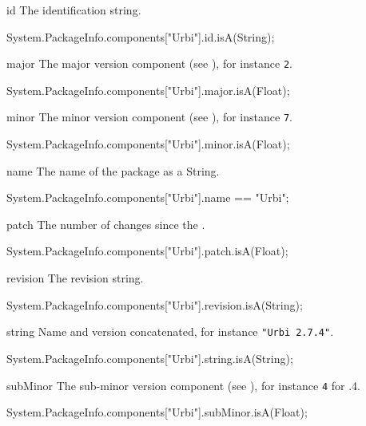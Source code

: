 \begin{urbiscriptapi}
\item[id] The identification string.
\begin{urbiassert}
System.PackageInfo.components["Urbi"].id.isA(String);
\end{urbiassert}


\item[major] The major version component (see ), for
  instance \lstinline|2|.
\begin{urbiassert}
System.PackageInfo.components["Urbi"].major.isA(Float);
\end{urbiassert}


\item[minor] The minor version component (see ), for
  instance \lstinline|7|.
\begin{urbiassert}
System.PackageInfo.components["Urbi"].minor.isA(Float);
\end{urbiassert}


\item[name] The name of the package as a String.
\begin{urbiassert}
System.PackageInfo.components["Urbi"].name
  == "Urbi";
\end{urbiassert}


\item[patch] The number of changes since the .
\begin{urbiassert}
System.PackageInfo.components["Urbi"].patch.isA(Float);
\end{urbiassert}


\item[revision] The revision string.
\begin{urbiassert}
System.PackageInfo.components["Urbi"].revision.isA(String);
\end{urbiassert}


\item[string] Name and version concatenated, for instance
  \lstinline|"Urbi 2.7.4"|.
\begin{urbiassert}
System.PackageInfo.components["Urbi"].string.isA(String);
\end{urbiassert}


\item[subMinor] The sub-minor version component (see ), for
  instance \lstinline|4| for .4.
\begin{urbiassert}
System.PackageInfo.components["Urbi"].subMinor.isA(Float);
\end{urbiassert}



\end{urbiscriptapi}
